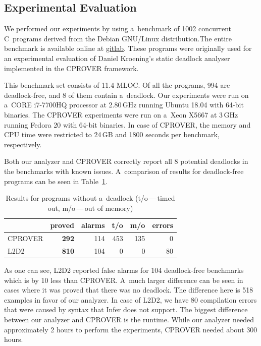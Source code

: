 \documentclass{ExcelAtFIT}
\begin{document}
\subsection{Experimental Evaluation}
We performed our experiments by using a~benchmark of 1002 concurrent C~programs derived from the Debian GNU/Linux distribution.The entire benchmark is available online at \href{https://pajda.fit.vutbr.cz/xmarci10/fbinfer_concurrency/tree/master/infer/tests/codetoanalyze/c/deadlock}{gitlab}. These programs were originally used for an experimental evaluation of Daniel Kroening's static deadlock analyser~\cite{cprover} implemented in the CPROVER framework.

This benchmark set consists of 11.4 MLOC. Of all the programs, 994 are deadlock-free, and 8 of them contain a~deadlock. Our experiments were run on a~CORE i7-7700HQ processor at 2.80\,GHz running Ubuntu 18.04 with 64-bit binaries. The CPROVER experiments were run on a~Xeon X5667 at 3\,GHz running Fedora 20 with 64-bit binaries. In case of CPROVER, the memory and CPU time were restricted to 24\,GB and 1800 seconds per benchmark, respectively.

Both our analyzer and CPROVER correctly report all 8 potential deadlocks in the benchmarks with known issues. A~comparison of results for deadlock-free programs can be seen in Table~\ref{tbl:DeadlockBanch}.
\begin{table}[b]
\caption{Results for programs without a~deadlock (t/o\,---\,timed out, m/o\,---\,out of memory)}
\begin{tabular}{l|r|r|r|r|r}
        & \multicolumn{1}{l|}{\textbf{proved}} & \multicolumn{1}{l|}{alarms} & \multicolumn{1}{l|}{t/o} & \multicolumn{1}{l|}{m/o} & \multicolumn{1}{l}{errors} \\ \hline
CPROVER & \textbf{292}                        & 114                        & 453                     & 135                     & 0                          \\
L2D2    & \textbf{810}                        & 104                        & 0                       & 0                       & 80
\end{tabular}
\label{tbl:DeadlockBanch}
\vspace{-3mm}
\end{table}

As one can see, L2D2 reported false alarms for 104 deadlock-free benchmarks which is by 10 less than CPROVER. A~much larger difference can be seen in cases where it was proved that there was no deadlock. The difference here is 518 examples in favor of our analyzer. In case of L2D2, we have 80 compilation errors that were caused by syntax that Infer does not support. The biggest difference between our analyzer and CPROVER is the runtime. While our analyzer needed approximately 2 hours to perform the experiments, CPROVER needed about 300 hours.
\end{document}
